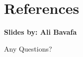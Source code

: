 \documentclass[serif, aspectratio=169]{beamer}
\begin{document}
\section{References}

\begin{frame}[allowframebreaks]
	\textbf{Slides by: Ali Bavafa}
	\vspace{1cm}
	
	
	\nocite{*} %
\end{frame}


\begin{frame}
	\begin{center}
		{\Huge Any Questions?}
	\end{center}
\end{frame}
\end{document}
